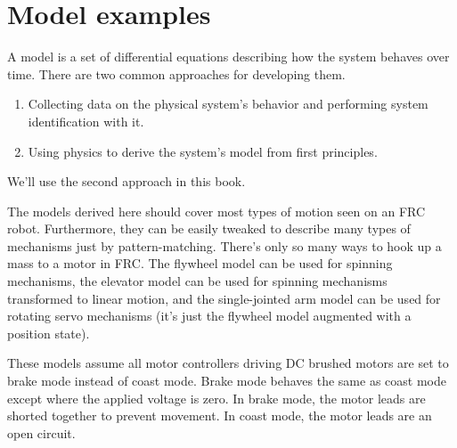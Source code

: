 
\chapter{Model examples}

A \gls{model} is a set of differential equations describing how the \gls{system}
behaves over time. There are two common approaches for developing them.
\begin{enumerate}
  \item Collecting data on the physical system's behavior and performing
    \gls{system} identification with it.
  \item Using physics to derive the \gls{system}'s model from first principles.
\end{enumerate}

We'll use the second approach in this book.

The \glspl{model} derived here should cover most types of motion seen on an FRC
robot. Furthermore, they can be easily tweaked to describe many types of
mechanisms just by pattern-matching. There's only so many ways to hook up a mass
to a motor in FRC. The flywheel \gls{model} can be used for spinning mechanisms,
the elevator \gls{model} can be used for spinning mechanisms transformed to
linear motion, and the single-jointed arm \gls{model} can be used for rotating
servo mechanisms (it's just the flywheel \gls{model} augmented with a position
\gls{state}).

These \glspl{model} assume all motor controllers driving DC brushed motors are
set to brake mode instead of coast mode. Brake mode behaves the same as coast
mode except where the applied voltage is zero. In brake mode, the motor leads
are shorted together to prevent movement. In coast mode, the motor leads are an
open circuit.

\renewcommand*{\chapterpath}{\partpath/model-examples}






